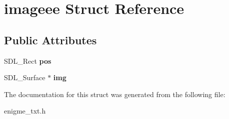 \hypertarget{structimageee}{}\section{imageee Struct Reference}
\label{structimageee}
\subsection*{Public Attributes}
\begin{DoxyCompactItemize}
\item 
\mbox{\label{structimageee_a01fe11d8ce12b2eb1f5d549e140e179c}} 
S\+D\+L\+\_\+\+Rect {\bfseries pos}
\item 
\mbox{\label{structimageee_a9aa6cb7867fc33ced7a788610df59b48}} 
S\+D\+L\+\_\+\+Surface $\ast$ {\bfseries img}
\end{DoxyCompactItemize}


The documentation for this struct was generated from the following file\+:\begin{DoxyCompactItemize}
\item 
enigme\+\_\+txt.\+h\end{DoxyCompactItemize}
